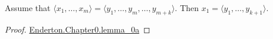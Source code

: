 \documentclass{article}
\begin{document}
\begin{theorem}[Lemma 0A]

  Assume that $\langle x_1, \ldots, x_m \rangle = \langle y_1, \ldots, y_m, \ldots, y_{m+k} \rangle$.
  Then $x_1 = \langle y_1, \ldots, y_{k+1} \rangle$.

\end{theorem}

\begin{proof}

  \href{Chapter0.lean}{Enderton.Chapter0.lemma_0a}

\end{proof}
\end{document}
